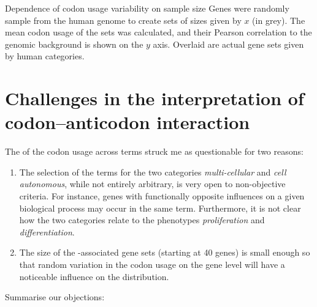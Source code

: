     {Dependence of codon usage variability on sample size}
    {Genes were randomly sample from the human genome to create sets of sizes
    given by \(x\) (in grey). The mean codon usage of the sets was calculated,
    and their Pearson correlation to the genomic background is shown on the
    \(y\) axis. Overlaid are actual gene sets given by human \go categories.}

\section{Challenges in the interpretation of codon–anticodon interaction}

The \pca of the codon usage across \go terms struck me as questionable for two
reasons:

\begin{enumerate}
    \item The selection of the \go terms for the two categories
        \emph{multi-cellular} and \emph{cell autonomous}, while not entirely
        arbitrary, is very open to non-objective criteria. For instance, genes
        with functionally opposite influences on a given biological process may
        occur in the same \go term. Furthermore, it is not clear how the two
        categories relate to the phenotypes \emph{proliferation} and
        \emph{differentiation}.
    \item The size of the \go-associated gene sets (starting at \num{40} genes)
        is small enough so that random variation in the codon usage on the gene
        level will have a noticeable influence on the distribution.
\end{enumerate}

Summarise our objections:


